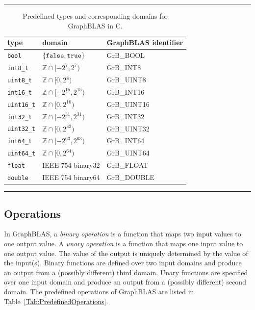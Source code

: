 \documentclass[11pt]{extarticle}
\begin{document}
\begin{table}
\hrule
\begin{center}
\caption{Predefined types and corresponding domains for GraphBLAS in C. 
		}
\label{Tab:PredefinedTypes}
\begin{tabular}{l|l|l}
type	& domain & GraphBLAS identifier \\ \hline
{\tt bool}	& $\{ {\tt false}, {\tt true} \}$	& {\sf GrB\_BOOL} \\
{\tt int8\_t}	& $\mathbb{Z} \cap [-2^{7},2^{7})$ 	& {\sf GrB\_INT8} \\
{\tt uint8\_t}	& $\mathbb{Z} \cap [0,2{^8})$ 		& {\sf GrB\_UINT8} \\
{\tt int16\_t}	& $\mathbb{Z} \cap [-2^{15},2^{15})$ 	& {\sf GrB\_INT16} \\
{\tt uint16\_t}	& $\mathbb{Z} \cap [0,2^{16})$ 		& {\sf GrB\_UINT16} \\
{\tt int32\_t}	& $\mathbb{Z} \cap [-2^{31},2^{31})$ 	& {\sf GrB\_INT32} \\
{\tt uint32\_t}	& $\mathbb{Z} \cap [0,2^{32})$ 		& {\sf GrB\_UINT32} \\
{\tt int64\_t}	& $\mathbb{Z} \cap [-2^{63},2^{63})$ 	& {\sf GrB\_INT64} \\
{\tt uint64\_t}	& $\mathbb{Z} \cap [0,2^{64})$ 		& {\sf GrB\_UINT64} \\
{\tt float}	& IEEE 754 {\sf binary32} 		& {\sf GrB\_FLOAT} \\
{\tt double}	& IEEE 754 {\sf binary64} 		& {\sf GrB\_DOUBLE} \\
\end{tabular}
\end{center}
\hrule
\end{table}

\subsection{Operations}

In GraphBLAS, a \emph{binary operation} is a function that maps two input
values to one output value. A \emph{unary operation} is a function that 
maps one input value to one output value. The value of the output is uniquely
determined by the value of the input(s).
Binary functions are defined over two input domains and produce an output from
a (possibly different) third domain. Unary functions are specified
over one input domain and produce an output from a (possibly different)
second domain.
The predefined operations of GraphBLAS are listed in
Table~\ref{Tab:PredefinedOperations}.
\end{document}
